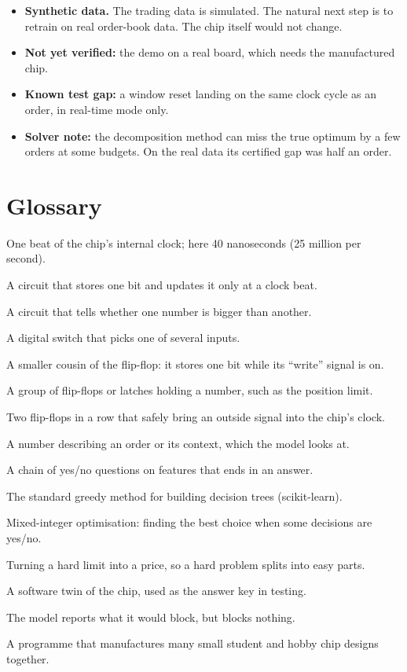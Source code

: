 \documentclass[11pt,a4paper]{article}
\begin{document}
\begin{itemize}
  \item \textbf{Synthetic data.} The trading data is simulated. The natural next step is to retrain
        on real order-book data. The chip itself would not change.
  \item \textbf{Not yet verified:} the demo on a real board, which needs the manufactured chip.
  \item \textbf{Known test gap:} a window reset landing on the same clock cycle as an order, in
        real-time mode only.
  \item \textbf{Solver note:} the decomposition method can miss the true optimum by a few orders
        at some budgets. On the real data its certified gap was half an order.
\end{itemize}

\section{Glossary}

\begin{description}[style=nextline, leftmargin=0pt, labelsep=0pt]
  \item[Clock cycle] One beat of the chip's internal clock; here 40 nanoseconds (25 million per second).
  \item[Flip-flop] A circuit that stores one bit and updates it only at a clock beat.
  \item[Comparator] A circuit that tells whether one number is bigger than another.
  \item[Multiplexer] A digital switch that picks one of several inputs.
  \item[Latch] A smaller cousin of the flip-flop: it stores one bit while its ``write'' signal is on.
  \item[Register] A group of flip-flops or latches holding a number, such as the position limit.
  \item[Synchroniser] Two flip-flops in a row that safely bring an outside signal into the chip's clock.
  \item[Feature] A number describing an order or its context, which the model looks at.
  \item[Decision tree] A chain of yes/no questions on features that ends in an answer.
  \item[CART] The standard greedy method for building decision trees (scikit-learn).
  \item[MIO] Mixed-integer optimisation: finding the best choice when some decisions are yes/no.
  \item[Lagrangian relaxation] Turning a hard limit into a price, so a hard problem splits into easy parts.
  \item[Golden model] A software twin of the chip, used as the answer key in testing.
  \item[Shadow mode] The model reports what it would block, but blocks nothing.
  \item[Tiny Tapeout] A programme that manufactures many small student and hobby chip designs together.
\end{description}
\end{document}

